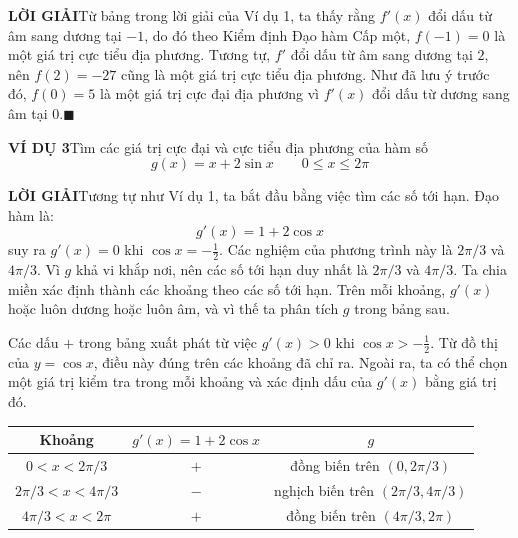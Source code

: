 \noindent
\begin{minipage}[t]{\leftcolwidth}
    \vspace{0pt}\mbox{}
\end{minipage}\hfill
\begin{minipage}[t]{\rightcolwidth}
    \vspace{0pt}
    \textbf{\textsf{\color{stewartcyan}LỜI GIẢI}}\quad Từ bảng trong lời giải của Ví dụ 1, ta thấy rằng $f'(x)$ đổi dấu từ âm sang dương tại $-1$, do đó theo Kiểm định Đạo hàm Cấp một, $f(-1) = 0$ là một giá trị cực tiểu địa phương. Tương tự, $f'$ đổi dấu từ âm sang dương tại $2$, nên $f(2) = -27$ cũng là một giá trị cực tiểu địa phương. Như đã lưu ý trước đó, $f(0) = 5$ là một giá trị cực đại địa phương vì $f'(x)$ đổi dấu từ dương sang âm tại $0$.\hfill{\color{stewartcyan}$\blacksquare$}

    \vspace{2.5mm}
    \textbf{\textsf{\color{stewartcyan}VÍ DỤ 3}}\quad Tìm các giá trị cực đại và cực tiểu địa phương của hàm số
    \[
    g(x) = x + 2\sin x \qquad 0 \leqslant x \leqslant 2\pi
    \]

    \textbf{\textsf{\color{stewartcyan}LỜI GIẢI}}\quad Tương tự như Ví dụ 1, ta bắt đầu bằng việc tìm các số tới hạn. Đạo hàm là:
    \[
    g'(x) = 1 + 2\cos x
    \]
    suy ra $g'(x) = 0$ khi $\cos x = -\frac{1}{2}$. Các nghiệm của phương trình này là $2\pi/3$ và $4\pi/3$. Vì $g$ khả vi khắp nơi, nên các số tới hạn duy nhất là $2\pi/3$ và $4\pi/3$. Ta chia miền xác định thành các khoảng theo các số tới hạn. Trên mỗi khoảng, $g'(x)$ hoặc luôn dương hoặc luôn âm, và vì thế ta phân tích $g$ trong bảng sau.
\end{minipage}

\vspace{3mm}
\noindent
\begin{minipage}[c]{\leftcolwidth}
    {\footnotesize\raggedright
    Các dấu $+$ trong bảng xuất phát từ việc $g'(x) > 0$ khi $\cos x > -\frac{1}{2}$. Từ đồ thị của $y = \cos x$, điều này đúng trên các khoảng đã chỉ ra. Ngoài ra, ta có thể chọn một giá trị kiểm tra trong mỗi khoảng và xác định dấu của $g'(x)$ bằng giá trị đó.\par}
\end{minipage}\hfill
\begin{minipage}[c]{\rightcolwidth}
    \centering
    \renewcommand{\arraystretch}{1.35}
    \small
    \begin{tabular}{|c|c|c|}
    \hline
    \rowcolor{tableheader}
    \textbf{Khoảng} & \boldmath$g'(x) = 1 + 2\cos x$ & \boldmath$g$ \\
    \hline
    $0 < x < 2\pi/3$ & $+$ & đồng biến trên $(0, 2\pi/3)$ \\
    $2\pi/3 < x < 4\pi/3$ & $-$ & nghịch biến trên $(2\pi/3, 4\pi/3)$ \\
    $4\pi/3 < x < 2\pi$ & $+$ & đồng biến trên $(4\pi/3, 2\pi)$ \\
    \hline
    \end{tabular}
\end{minipage}

